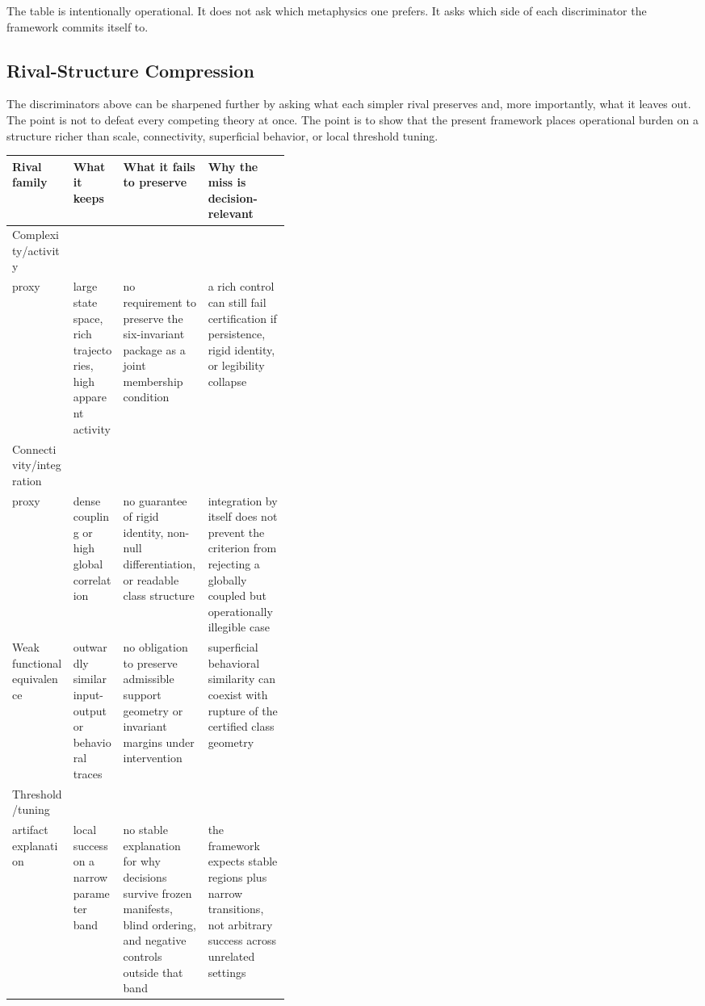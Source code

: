 \documentclass[11pt,a4paper]{article}
\begin{document}
The table is intentionally operational. It does not ask which metaphysics one prefers. It asks which side of each discriminator the framework commits itself to.

\subsection{Rival-Structure Compression}
The discriminators above can be sharpened further by asking what each simpler rival preserves and, more importantly, what it leaves out. The point is not to defeat every competing theory at once. The point is to show that the present framework places operational burden on a structure richer than scale, connectivity, superficial behavior, or local threshold tuning.

\begin{center}
\small
\renewcommand{\arraystretch}{1.16}
\setlength{\tabcolsep}{5pt}
\begin{tabularx}{\linewidth}{@{}P{0.22\linewidth}P{0.18\linewidth}Y Y@{}}
\toprule
Rival family & What it keeps & What it fails to preserve & Why the miss is decision-relevant \\
\midrule
Complexity/activity\\proxy & large state space, rich trajectories, high apparent activity & no requirement to preserve the six-invariant package as a joint membership condition & a rich control can still fail certification if persistence, rigid identity, or legibility collapse \\
Connectivity/\allowbreak integration\\proxy & dense coupling or high global correlation & no guarantee of rigid identity, non-null differentiation, or readable class structure & integration by itself does not prevent the criterion from rejecting a globally coupled but operationally illegible case \\
Weak functional equivalence & outwardly similar input-output or behavioral traces & no obligation to preserve admissible support geometry or invariant margins under intervention & superficial behavioral similarity can coexist with rupture of the certified class geometry \\
Threshold/tuning\\artifact explanation & local success on a narrow parameter band & no stable explanation for why decisions survive frozen manifests, blind ordering, and negative controls outside that band & the framework expects stable regions plus narrow transitions, not arbitrary success across unrelated settings \\
\bottomrule
\end{tabularx}
\end{center}
\end{document}
